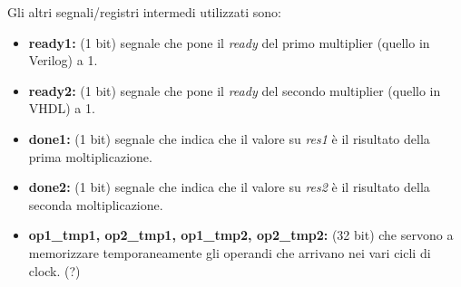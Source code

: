 \documentclass[]{IEEEtran}
\begin{document}
Gli altri segnali/registri intermedi utilizzati sono:
\begin{itemize}
    \item \textbf{ready1:} (1 bit) segnale che pone il \textit{ready} del primo multiplier (quello in Verilog) a 1.
    \item \textbf{ready2:} (1 bit) segnale che pone il \textit{ready} del secondo multiplier (quello in VHDL) a 1.
    \item \textbf{done1:} (1 bit) segnale che indica che il valore su \textit{res1} è il risultato della prima moltiplicazione.
    \item \textbf{done2:} (1 bit) segnale che indica che il valore su \textit{res2} è il risultato della seconda moltiplicazione.
    \item \textbf{op1\_tmp1, op2\_tmp1, op1\_tmp2, op2\_tmp2:} (32 bit) che servono a memorizzare temporaneamente gli operandi che arrivano nei vari cicli di clock. (?)
\end{itemize}
\end{document}
